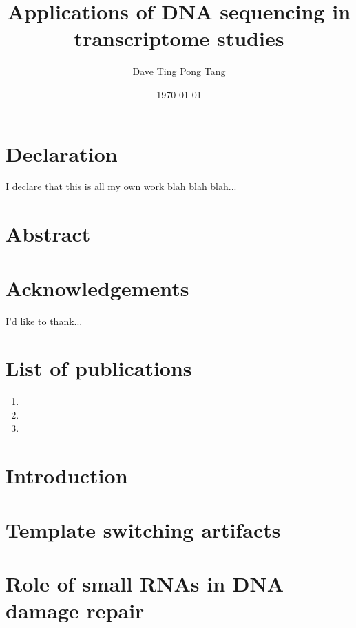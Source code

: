\documentclass[12pt,a4paper]{report}
\begin{document}
%

\title{
   {Applications of DNA sequencing in transcriptome studies}
}

\author{Dave Ting Pong Tang}
\date{\today}
\maketitle

\chapter*{Declaration}
I declare that this is all my own work blah blah blah...

\chapter*{Abstract}


\chapter*{Acknowledgements}
I'd like to thank...

\chapter*{List of publications}

\begin{enumerate}
\item {}
\item {}
\item {}
\end{enumerate}

\tableofcontents

\listoffigures



\chapter{Introduction}


\chapter{Template switching artifacts}



\chapter{Role of small RNAs in DNA damage repair}


\end{document}
